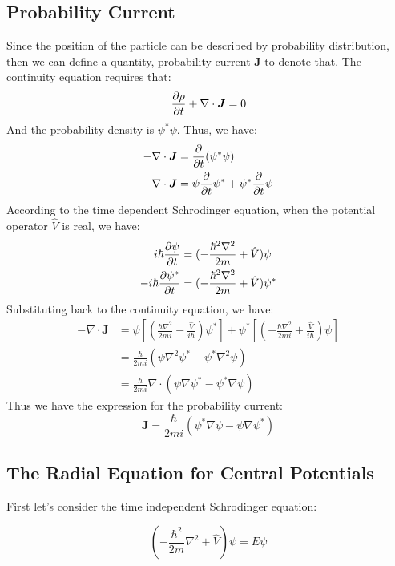 \documentclass[../main.tex]{subfiles}
\begin{document}
\subsection{Probability Current}
Since the position of the particle can be described by probability distribution, then we can define a quantity, probability current $\bm{J}$ to denote that. The continuity equation requires that:
\begin{equation}
    \pdv{\rho}{t} + \nabla \cdot \bm{J} = 0
\end{equation}
And the probability density is $\psi^*\psi$. Thus, we have:
\begin{align}
    -\nabla \cdot \bm{J} &= \pdv{t}(\psi^*\psi)\nonumber\\
    -\nabla \cdot \bm{J} &= \psi\pdv{t}\psi^* + \psi^*\pdv{t}\psi
\end{align}
According to the time dependent Schrodinger equation, when the potential operator $\hat{V}$ is real, we have:
\begin{align}
    i\hbar \pdv{\psi}{t} &= (-\frac{\hbar^2\nabla^2}{2m} + \hat{V}) \psi\\
    -i\hbar \pdv{\psi^*}{t} &= (-\frac{\hbar^2\nabla^2}{2m} + \hat{V})\psi^*
\end{align}
Substituting back to the continuity equation, we have:
\begin{align}
    -\nabla \cdot \bm{J} &= \psi [(\frac{\hbar\nabla^2}{2mi} - \frac{\hat{V}}{i\hbar})\psi^*] + \psi^* [(-\frac{\hbar\nabla^2}{2mi} + \frac{\hat{V}}{i\hbar}) \psi]\nonumber\\
    &= \frac{\hbar}{2mi}(\psi\nabla^2 \psi^* - \psi^*\nabla^2\psi)\nonumber\\
    &= \frac{\hbar}{2mi}\nabla \cdot(\psi\nabla \psi^* - \psi^*\nabla\psi)
\end{align} 
Thus we have the expression for the probability current:
\begin{equation}
    \bm{J} = \frac{\hbar}{2mi}(\psi^*\nabla \psi - \psi\nabla\psi^*)
\end{equation}

\subsection{The Radial Equation for Central Potentials}
\label{section:The Radial Equation for Central Potentials}
First let's consider the time independent Schrodinger equation:

\begin{equation}
    (-\frac{\hbar^2}{2m}\nabla^2 + \hat{V})\psi = E\psi
\end{equation}
\end{document}
